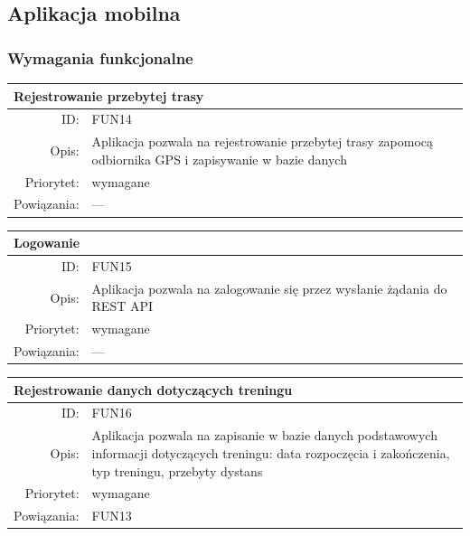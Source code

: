 \subsection{Aplikacja mobilna} %
\subsubsection{Wymagania funkcjonalne}
\label{sub:aplikacja_mobilna}
\begin{center}
      \begin{tabular}{rp{10cm}}
	      \multicolumn{2}{l}{\textbf{Rejestrowanie przebytej trasy}} \\
	      \hline
	      ID: & FUN14 \\
	      Opis: & Aplikacja pozwala na rejestrowanie przebytej trasy zapomocą odbiornika GPS i zapisywanie w bazie danych \\
	      Priorytet: & wymagane \\
	      Powiązania: & --- \\
    \end{tabular}
\end{center}

\begin{center}
      \begin{tabular}{rp{10cm}}
	      \multicolumn{2}{l}{\textbf{Logowanie}} \\
	      \hline
	      ID: & FUN15 \\
	      Opis: & Aplikacja pozwala na zalogowanie się przez wysłanie żądania do REST API \\
	      Priorytet: & wymagane \\
	      Powiązania: & --- \\
    \end{tabular}
\end{center}

\begin{center}
      \begin{tabular}{rp{10cm}}
	      \multicolumn{2}{l}{\textbf{Rejestrowanie danych dotyczących treningu}} \\
	      \hline
	      ID: & FUN16 \\
	      Opis: & Aplikacja pozwala na zapisanie w bazie danych podstawowych informacji dotyczących treningu: data rozpoczęcia i zakończenia, typ treningu, przebyty dystans  \\
	      Priorytet: & wymagane \\
	      Powiązania: & FUN13 \\
    \end{tabular}
\end{center}


